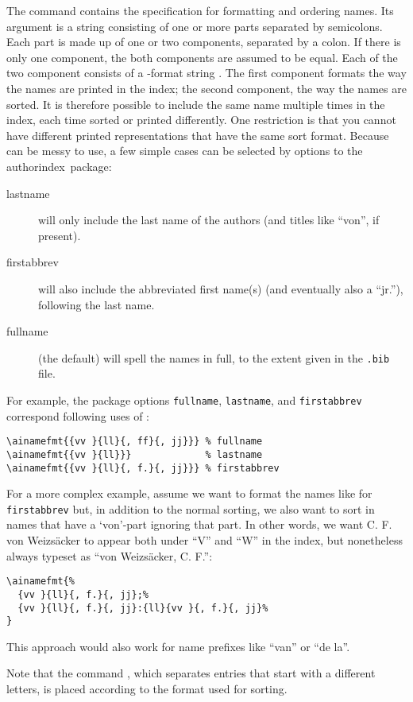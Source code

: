 \documentclass[a4paper]{article}
\newcommand{\package}[1]{\textsf{#1}}
\newcommand{\authorindex}{\package{authorindex}}
\newcommand{\file}[1]{\texttt{#1}}
\newcommand{\fnext}[1]{\file{.#1}}
\newcommand{\ltxinp}[1]{\texttt{\string#1}}
\begin{document}
The command \ltxinp{\ainamefmt} contains the specification for formatting and
ordering names. Its argument is a string consisting of one or more parts
separated by semicolons.  Each part is made up of one or two components,
separated by a colon.  If there is only one component, the both components are
assumed to be equal.  Each of the two component consists of a \BibTeX-format
string \cite{Patashnik88b}. The first component formats the way the names are
printed in the index; the second component, the way the names are sorted.  It
is therefore possible to include the same name multiple times in the index,
each time sorted or printed differently. One restriction is that you cannot
have different printed representations that have the same sort format. Because
\ltxinp{\ainamefmt} can be messy to use, a few simple cases can be selected by
options to the \authorindex\ package: {\small
\begin{description}
\item[lastname] will only include the last name of the authors (and titles like
  ``von'', if present).
\item[firstabbrev] will also include the abbreviated first name(s) (and
  eventually also a ``jr.''), following the last name.
\item[fullname] (the default) will spell the names in full, to the extent given
  in the \fnext{bib} file.
\end{description}}

For example, the package options \ltxinp{fullname}, \ltxinp{lastname}, and
\ltxinp{firstabbrev} correspond following uses of \ltxinp{\ainamefmt}:
\begin{verbatim}
\ainamefmt{{vv }{ll}{, ff}{, jj}}} % fullname
\ainamefmt{{vv }{ll}}}             % lastname
\ainamefmt{{vv }{ll}{, f.}{, jj}}} % firstabbrev
\end{verbatim}
For a more complex example, assume we want to format the names like for
\ltxinp{firstabbrev} but, in addition to the normal sorting, we also want to
sort in names that have a `von'-part ignoring that part.  In other words, we
want C. F. von Weizs\"{a}cker to appear both under ``V'' and ``W'' in the
index, but nonetheless always typeset as ``von Weizs\"{a}cker, C. F.'':
\begin{verbatim}
\ainamefmt{%
  {vv }{ll}{, f.}{, jj};%
  {vv }{ll}{, f.}{, jj}:{ll}{vv }{, f.}{, jj}%
}
\end{verbatim}
This approach would also work for name prefixes like ``van'' or ``de la''.

Note that the command \ltxinp{\indexspace}, which separates entries that start
with a different letters, is placed according to the format used for sorting.
\end{document}
